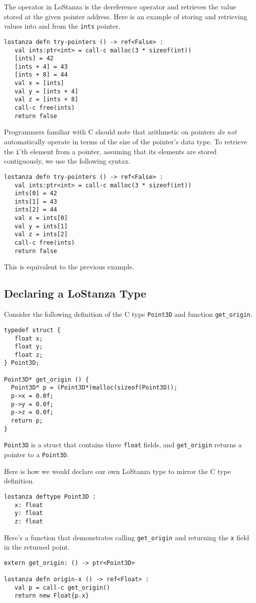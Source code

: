 \documentclass[10pt,oneside]{book}
\begin{document}
The \texttt{\frenchspacing []} operator in LoStanza is the dereference operator and retrieves the value stored at the given pointer address. Here is an example of storing and retrieving values into and from the \texttt{\frenchspacing ints} pointer.
\begin{lstlisting}
lostanza defn try-pointers () -> ref<False> :
   val ints:ptr<int> = call-c malloc(3 * sizeof(int))
   [ints] = 42
   [ints + 4] = 43
   [ints + 8] = 44
   val x = [ints]
   val y = [ints + 4]
   val z = [ints + 8]
   call-c free(ints)
   return false
\end{lstlisting}
Programmers familiar with C should note that arithmetic on pointers {\em do not} automatically operate in terms of the size of the pointer's data type. To retrieve the \texttt{\frenchspacing i}'th element from a pointer, assuming that its elements are stored contiguously, we use the following syntax.
\begin{lstlisting}
lostanza defn try-pointers () -> ref<False> :
   val ints:ptr<int> = call-c malloc(3 * sizeof(int))
   ints[0] = 42
   ints[1] = 43
   ints[2] = 44
   val x = ints[0]
   val y = ints[1]
   val z = ints[2]
   call-c free(ints)
   return false
\end{lstlisting}
This is equivalent to the previous example.

\subsection*{Declaring a LoStanza Type}
Consider the following definition of the C type \texttt{\frenchspacing Point3D} and function \texttt{\frenchspacing get\_origin}.
\begin{lstlisting}
typedef struct {
   float x;
   float y;
   float z;
} Point3D;

Point3D* get_origin () {
  Point3D* p = (Point3D*)malloc(sizeof(Point3D));
  p->x = 0.0f;
  p->y = 0.0f;
  p->z = 0.0f;
  return p;
}
\end{lstlisting}
\texttt{\frenchspacing Point3D} is a struct that contains three \texttt{\frenchspacing float} fields, and \texttt{\frenchspacing get\_origin} returns a pointer to a \texttt{\frenchspacing Point3D}. 

Here is how we would declare our own LoStanza type to mirror the C type definition.
\begin{lstlisting}
lostanza deftype Point3D :
   x: float
   y: float
   z: float
\end{lstlisting}

Here's a function that demonstrates calling \texttt{\frenchspacing get\_origin} and returning the \texttt{\frenchspacing x} field in the returned point.
\begin{lstlisting}
extern get_origin: () -> ptr<Point3D>

lostanza defn origin-x () -> ref<Float> :
   val p = call-c get_origin()
   return new Float{p.x}
\end{lstlisting}
\end{document}
